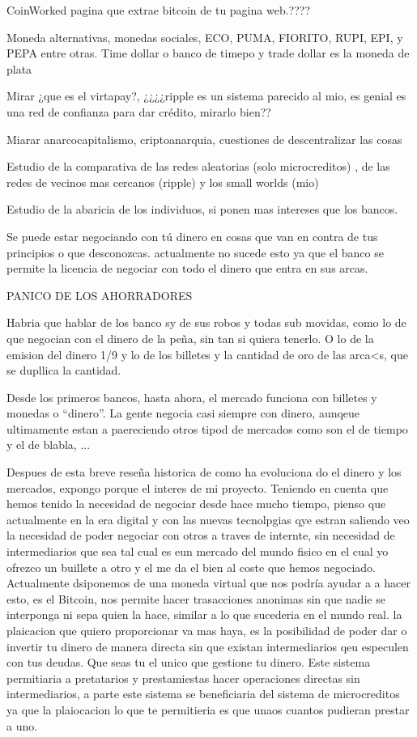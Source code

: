 CoinWorked pagina que extrae bitcoin de tu pagina web.????

Moneda alternativas, monedas sociales, ECO, PUMA, FIORITO, RUPI, EPI, y PEPA entre otras. Time dollar o banco de timepo y trade dollar es la moneda de plata

Mirar ¿que es el virtapay?, ¿¿¿¿ripple es un sistema parecido al mio, es genial es una red de confianza para dar crédito, mirarlo bien??

Miarar anarcocapitalismo, criptoanarquia, cuestiones de descentralizar las cosas

Estudio de la comparativa de las redes aleatorias (solo microcreditos) , de las redes de vecinos mas cercanos (ripple) y los small worlds (mio)

Estudio de la abaricia de los individuos, si ponen mas intereses que los bancos.

Se puede estar negociando con tú dinero en cosas que van en contra de tus principios o que desconozcas. actualmente no sucede esto ya que el banco se permite la licencia de negociar con todo el dinero que entra en sus arcas.

PANICO DE LOS AHORRADORES

Habria que hablar de los banco sy de sus robos y todas sub movidas, como lo de que negocian con el dinero de la peña, sin tan si quiera tenerlo. O lo de la emision del dinero 1/9 y lo de los billetes y la cantidad de oro de las arca<s, que se dupllica la cantidad.

Desde los primeros bancos, hasta ahora, el mercado funciona con billetes y monedas o ``dinero''. La gente negocia casi siempre con dinero, aunqeue ultimamente estan a paereciendo otros tipod de mercados como son el de tiempo y el de blabla, ...


Despues de esta breve reseña historica de como ha evoluciona do el dinero y los mercados, expongo porque el interes de mi proyecto. Teniendo en cuenta que hemos tenido la necesidad de negociar desde hace mucho tiempo, pienso que actualmente en la era digital y con las nuevas tecnolpgias qye estran saliendo veo la necesidad de poder negociar con otros a traves de internte, sin necesidad de intermediarios que sea tal cual es eun mercado del mundo fisico en el cual yo ofrezco un buillete a otro y el me da el bien al coste que hemos negociado. Actualmente dsiponemos de una moneda virtual que nos podría ayudar a a hacer esto, es el Bitcoin, nos permite hacer trasacciones anonimas sin que nadie se interponga ni sepa quien la hace, similar a lo que sucederia en el mundo real. la plaicacion que quiero proporcionar va mas haya, es la posibilidad de poder dar o invertir tu dinero de manera directa sin que existan intermediarios qeu especulen con tus deudas. Que seas tu el unico que gestione tu dinero. Este sistema permitiaria a pretatarios y prestamiestas hacer operaciones directas sin intermediarios, a parte este sistema se beneficiaria del sistema de microcreditos ya que la plaiocacion lo que te permitieria es que unaos cuantos pudieran prestar a uno.


